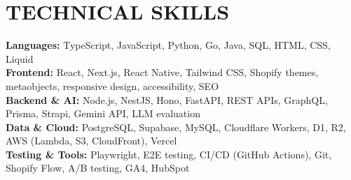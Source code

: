 \documentclass[letterpaper,10pt]{article}
\begin{document}
\section{TECHNICAL SKILLS}
\fontsize{9.5}{11.5}\selectfont
\noindent \textbf{Languages:} TypeScript, JavaScript, Python, Go, Java, SQL, HTML, CSS, Liquid \\
\noindent \textbf{Frontend:} React, Next.js, React Native, Tailwind CSS, Shopify themes, metaobjects, responsive design, accessibility, SEO \\
\noindent \textbf{Backend \& AI:} Node.js, NestJS, Hono, FastAPI, REST APIs, GraphQL, Prisma, Strapi, Gemini API, LLM evaluation \\
\noindent \textbf{Data \& Cloud:} PostgreSQL, Supabase, MySQL, Cloudflare Workers, D1, R2, AWS (Lambda, S3, CloudFront), Vercel \\
\noindent \textbf{Testing \& Tools:} Playwright, E2E testing, CI/CD (GitHub Actions), Git, Shopify Flow, A/B testing, GA4, HubSpot
\end{document}
